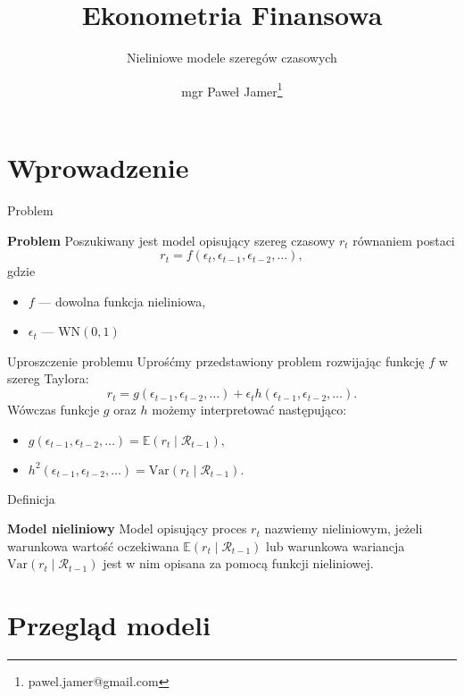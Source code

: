 \documentclass[a4paper, 11pt]{beamer}
\title{Ekonometria Finansowa}
\subtitle{Nieliniowe modele szeregów czasowych}
\author{mgr Paweł Jamer\thanks{pawel.jamer@gmail.com}}
\begin{document}
	\begin{frame}
		\titlepage
	\end{frame}
	
	\section{Wprowadzenie}
	
	\begin{frame}{Problem}
		\begin{block}{\textbf{Problem}}
			Poszukiwany jest model opisujący szereg czasowy $r_t$ równaniem postaci \[
				r_t = f\left(\epsilon_{t}, \epsilon_{t-1}, \epsilon_{t-2}, \ldots\right),
			\] gdzie
			\begin{itemize}
				\item $f$ --- dowolna funkcja nieliniowa,
				\item $\epsilon_{t}$ --- $\mbox{WN}\left(0,1\right)$
			\end{itemize}
		\end{block}
	\end{frame}
	
	\begin{frame}{Uproszczenie problemu}
		Uprośćmy przedstawiony problem rozwijając funkcję $f$ w szereg Taylora: \[
			r_t = g\left(\epsilon_{t-1}, \epsilon_{t-2}, \ldots\right) + \epsilon_t h\left(\epsilon_{t-1}, \epsilon_{t-2}, \ldots\right).
		\]
		Wówczas funkcje $g$ oraz $h$ możemy interpretować następująco:
		\begin{itemize}
			\item $g\left(\epsilon_{t-1}, \epsilon_{t-2}, \ldots\right) = \mathbb{E}\left(r_t \mid \mathcal{R}_{t-1}\right),$
			\item $h^2\left(\epsilon_{t-1}, \epsilon_{t-2}, \ldots\right) = \mbox{Var}\left(r_t \mid \mathcal{R}_{t-1}\right).$
		\end{itemize}
	\end{frame}
	
	\begin{frame}{Definicja}
		\begin{block}{\textbf{Model nieliniowy}}
			Model opisujący proces $r_t$ nazwiemy nieliniowym, jeżeli
			warunkowa wartość oczekiwana $\mathbb{E}\left(r_t \mid \mathcal{R}_{t-1}\right)$ lub
			warunkowa wariancja $\mbox{Var}\left(r_t \mid \mathcal{R}_{t-1}\right)$ jest
			w nim opisana za pomocą funkcji nieliniowej.
		\end{block}
	\end{frame}
	
	\section{Przegląd modeli}
	
\end{document}
